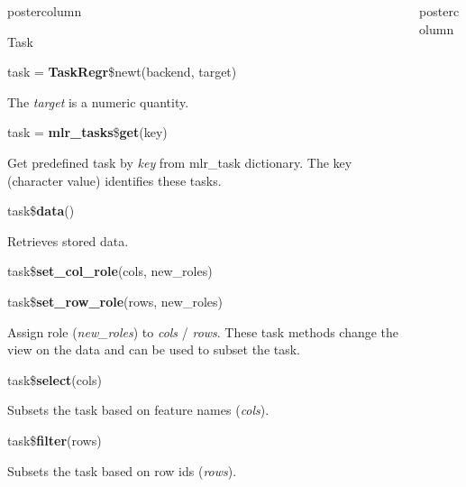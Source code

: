 \documentclass{beamer}
\begin{document}
\begin{frame}[fragile]{}
\begin{columns}
\begin{column}{.245\textwidth}
\begin{beamercolorbox}[center]{postercolumn}
\begin{minipage}{.98\textwidth}
{\begin{myblock}{Task}
						\\
						\begin{codebox}
							task = \textbf{TaskRegr}\$newt(backend, target)
						\end{codebox}
						\hspace*{1ex}The \textit{target} is a numeric quantity.
						\\
						\begin{codebox}
							task = \textbf{mlr\_tasks}\$\textbf{get}(key)
						\end{codebox}
						\hspace*{1ex}Get predefined task by \textit{key} from mlr\_task dictionary. The key (character value) identifies these tasks. 
						\\
						\begin{codebox}
							task\$\textbf{data}()
						\end{codebox}
						\hspace*{1ex}Retrieves stored data.
						\\
						\begin{codebox}
							task\$\textbf{set\_col\_role}(cols, new\_roles)
						\end{codebox}
						\begin{codebox}
							task\$\textbf{set\_row\_role}(rows, new\_roles)
						\end{codebox}
						\hspace*{1ex} Assign role (\textit{new\_roles}) to \textit{cols} / \textit{rows}. These task methods change the view on the data and can be used to subset the task.
						\\
						\begin{codebox}
							task\$\textbf{select}(cols)
						\end{codebox}
						\hspace*{1ex}Subsets the task based on feature names (\textit{cols}).
						\\
						\begin{codebox}
							task\$\textbf{filter}(rows)
						\end{codebox}
						\hspace*{1ex}Subsets the task based on row ids (\textit{rows}).
					\end{myblock}
					\vfill
				}
			\end{minipage}
		\end{beamercolorbox}
	\end{column}
	\begin{column}{.245\textwidth}
		\begin{beamercolorbox}[center]{postercolumn}

\end{beamercolorbox}
\end{column}
\end{columns}
\end{frame}
\end{document}
